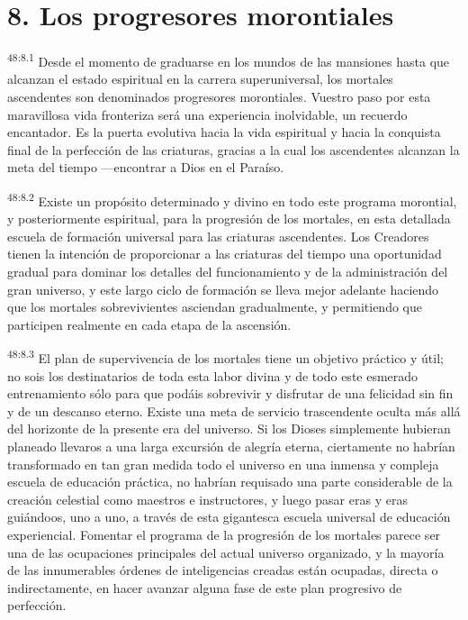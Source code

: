 \section*{8. Los progresores morontiales}
\par
\textsuperscript{48:8.1} Desde el momento de graduarse en los mundos de las mansiones hasta que alcanzan el estado espiritual en la carrera superuniversal, los mortales ascendentes son denominados progresores morontiales. Vuestro paso por esta maravillosa vida fronteriza será una experiencia inolvidable, un recuerdo encantador. Es la puerta evolutiva hacia la vida espiritual y hacia la conquista final de la perfección de las criaturas, gracias a la cual los ascendentes alcanzan la meta del tiempo ---encontrar a Dios en el Paraíso.

\par
\textsuperscript{48:8.2} Existe un propósito determinado y divino en todo este programa morontial, y posteriormente espiritual, para la progresión de los mortales, en esta detallada escuela de formación universal para las criaturas ascendentes. Los Creadores tienen la intención de proporcionar a las criaturas del tiempo una oportunidad gradual para dominar los detalles del funcionamiento y de la administración del gran universo, y este largo ciclo de formación se lleva mejor adelante haciendo que los mortales sobrevivientes asciendan gradualmente, y permitiendo que participen realmente en cada etapa de la ascensión.

\par
\textsuperscript{48:8.3} El plan de supervivencia de los mortales tiene un objetivo práctico y útil; no sois los destinatarios de toda esta labor divina y de todo este esmerado entrenamiento sólo para que podáis sobrevivir y disfrutar de una felicidad sin fin y de un descanso eterno. Existe una meta de servicio trascendente oculta más allá del horizonte de la presente era del universo. Si los Dioses simplemente hubieran planeado llevaros a una larga excursión de alegría eterna, ciertamente no habrían transformado en tan gran medida todo el universo en una inmensa y compleja escuela de educación práctica, no habrían requisado una parte considerable de la creación celestial como maestros e instructores, y luego pasar eras y eras guiándoos, uno a uno, a través de esta gigantesca escuela universal de educación experiencial. Fomentar el programa de la progresión de los mortales parece ser una de las ocupaciones principales del actual universo organizado, y la mayoría de las innumerables órdenes de inteligencias creadas están ocupadas, directa o indirectamente, en hacer avanzar alguna fase de este plan progresivo de perfección.

